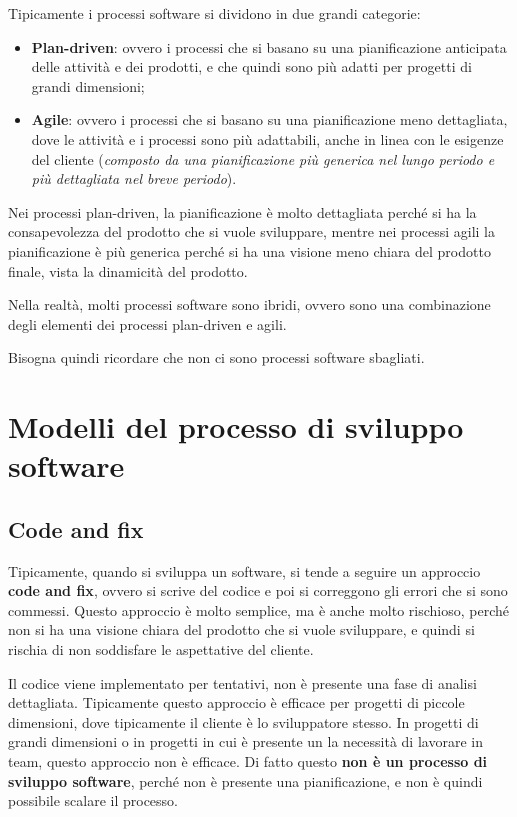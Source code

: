 Tipicamente i processi software si dividono in due grandi categorie:
\begin{itemize}
    \item \textbf{Plan-driven}: ovvero i processi che si basano su una pianificazione
    anticipata delle attività e dei prodotti, e che quindi sono più adatti per progetti
    di grandi dimensioni;
    \item \textbf{Agile}: ovvero i processi che si basano su una pianificazione
    meno dettagliata, dove le attività e i processi sono più adattabili, anche in 
    linea con le esigenze del cliente (\textit{composto da una pianificazione più 
    generica nel lungo periodo e più dettagliata nel breve periodo}).
\end{itemize}
Nei processi plan-driven, la pianificazione è molto dettagliata perché si ha 
la consapevolezza del prodotto che si vuole sviluppare, mentre nei processi agili
la pianificazione è più generica perché si ha una visione meno chiara del prodotto
finale, vista la dinamicità del prodotto.
\begin{tcolorbox}
    Nella realtà, molti processi software sono ibridi, ovvero sono una combinazione
    degli elementi dei processi plan-driven e agili.

    Bisogna quindi ricordare che non ci sono processi software sbagliati.
\end{tcolorbox}
\section{Modelli del processo di sviluppo software}
\subsection{Code and fix}
Tipicamente, quando si sviluppa un software, si tende a seguire un approccio
\textbf{code and fix}, ovvero si scrive del codice e poi si correggono gli errori
che si sono commessi. Questo approccio è molto semplice, ma è anche molto rischioso,
perché non si ha una visione chiara del prodotto che si vuole sviluppare, e quindi
si rischia di non soddisfare le aspettative del cliente.

Il codice viene implementato per tentativi, non è presente una fase di 
analisi dettagliata. Tipicamente questo approccio è efficace per progetti
di piccole dimensioni, dove tipicamente il cliente è lo sviluppatore stesso. In progetti 
di grandi dimensioni o in progetti in cui è presente un la necessità di lavorare 
in team, questo approccio non è efficace.
Di fatto questo \textbf{non è un processo di sviluppo software}, perché non è presente 
una pianificazione, e non è quindi possibile scalare il processo.
